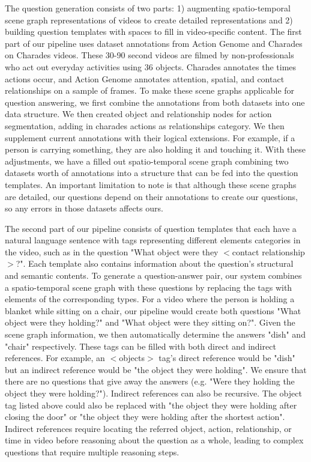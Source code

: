 \documentclass{article}
\newcommand{\mgm}[1]{{\color{cyan}{mgm: #1}}}
\begin{document}
The question generation consists of two parts: 1) augmenting spatio-temporal scene graph representations of videos to create detailed representations and 2) building question templates with spaces to fill in video-specific content. The first part of our pipeline uses dataset annotations from Action Genome and Charades \cite{ji2020action, sigurdsson2016hollywood} on Charades videos. These 30-90 second videos are filmed by non-professionals who act out everyday activities using 36 objects. Charades annotates the times actions occur, and Action Genome annotates attention, spatial, and contact relationships on a sample of frames. \mgm{figure} To make these scene graphs applicable for question answering, we first combine the annotations from both datasets into one data structure. We then created object and relationship nodes for action segmentation, adding in charades actions as relationships category. We then supplement current annotations with their logical extensions. For example, if a person is carrying something, they are also holding it and touching it. With these adjustments, we have a filled out spatio-temporal scene graph combining two datasets worth of annotations into a structure that can be fed into the question templates. An important limitation to note is that although these scene graphs are detailed, our questions depend on their annotations to create our questions, so any errors in those datasets affects ours.
    
The second part of our pipeline consists of question templates that each have a natural language sentence with tags representing different elements categories in the video, such as in the question "What object were they $<$contact relationship$>$?". Each template also contains information about the question's structural and semantic contents. To generate a question-answer pair, our system combines a spatio-temporal scene graph with these questions by replacing the tags with elements of the corresponding types. For a video where the person is holding a blanket while sitting on a chair, our pipeline would create both questions "What object were they holding?" and "What object were they sitting on?". Given the scene graph information, we then automatically determine the answers "dish" and "chair" respectively. These tags can be filled with both direct and indirect references. For example, an $<$objects$>$ tag's direct reference would be "dish" but an indirect reference would be "the object they were holding". We ensure that there are no questions that give away the answers (e.g. "Were they holding the object they were holding?"). Indirect references can also be recursive. The object tag listed above could also be replaced with "the object they were holding after closing the door" or "the object they were holding after the shortest action". Indirect references require locating the referred object, action, relationship, or time in video before reasoning about the question as a whole, leading to complex questions that require multiple reasoning steps. 
\end{document}
